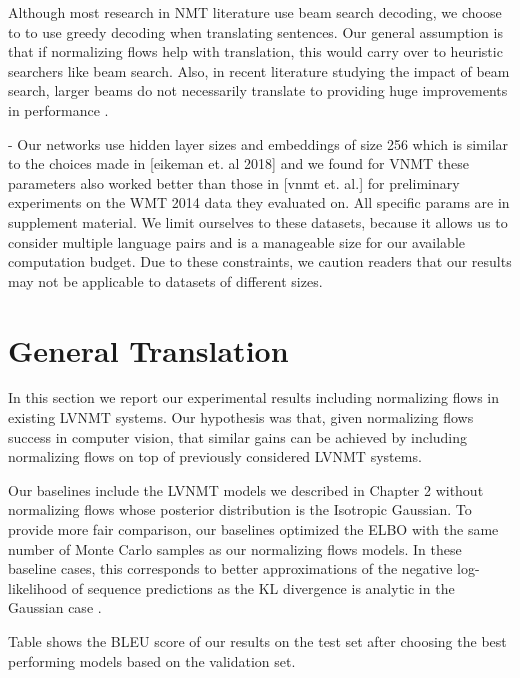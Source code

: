 Although most research in \ac{NMT} literature use beam search decoding, we choose to to use greedy decoding when translating sentences. Our general assumption is that if normalizing flows help with translation, this would carry over to heuristic searchers like beam search. Also, in recent literature studying the impact of beam search, larger beams do not necessarily translate to providing huge improvements in performance \cite{cohen2019unconstrained}. 

- Our networks use hidden layer sizes and embeddings of size 256 which is similar to the choices made in [eikeman et. al 2018] and we found for VNMT these parameters also worked better than those in [vnmt et. al.] for preliminary experiments on the WMT 2014 data they evaluated on. All specific params are in supplement material.
We limit ourselves to these datasets, because it allows us to consider multiple language pairs and is a manageable size for our available computation budget. Due to these constraints, we caution readers that our results may not be applicable to datasets of different sizes.

\section{General Translation}

In this section we report our experimental results including normalizing flows in existing \ac{LVNMT} systems. Our hypothesis was that, given normalizing flows success in computer vision, that similar gains can be achieved by including normalizing flows on top of previously considered \ac{LVNMT} systems.  

Our baselines include the \ac{LVNMT} models we described in Chapter 2 without normalizing flows whose posterior distribution is the Isotropic Gaussian. To provide more fair comparison, our baselines optimized the \ac{ELBO} with the same number of Monte Carlo samples as our normalizing flows models. In these baseline cases, this corresponds to better approximations of the negative log-likelihood of sequence predictions as the KL divergence is analytic in the Gaussian case \cite{kingma2014autoencodingVB,rezende2014stochasticBackprop}.

 Table \reminder{\#} shows the BLEU score of our results on the test set after choosing the best performing models based on the validation set. 



